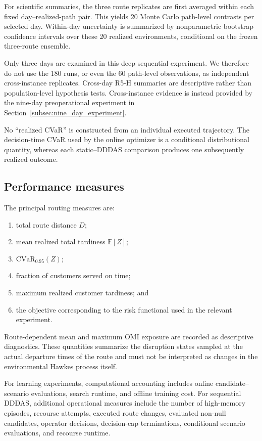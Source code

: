 \documentclass[preprint,12pt]{elsarticle}
\newcommand{\CVaR}{\mathrm{CVaR}}
\newcommand{\1}{\mathbf{1}}
\begin{document}
For scientific summaries, the three route replicates are first averaged within
each fixed day--realized-path pair. This yields 20 Monte Carlo path-level
contrasts per selected day. Within-day uncertainty is summarized by
nonparametric bootstrap confidence intervals over these 20 realized
environments, conditional on the frozen three-route ensemble.

Only three days are examined in this deep sequential experiment. We therefore
do not use the 180 runs, or even the 60 path-level observations, as independent
cross-instance replicates. Cross-day R5-H summaries are descriptive rather than
population-level hypothesis tests. Cross-instance evidence is instead provided
by the nine-day preoperational experiment in
Section~\ref{subsec:nine_day_experiment}.

No ``realized CVaR'' is constructed from an individual executed trajectory.
The decision-time CVaR used by the online optimizer is a conditional
distributional quantity, whereas each static--DDDAS comparison produces one
subsequently realized outcome.

\subsection{Performance measures}
\label{subsec:performance_metrics}

The principal routing measures are:
\begin{enumerate}
	\item total route distance $D$;
	\item mean realized total tardiness $\mathbb{E}[Z]$;
	\item $\CVaR_{0.95}(Z)$;
	\item fraction of customers served on time;
	\item maximum realized customer tardiness; and
	\item the objective corresponding to the risk functional used in the
	relevant experiment.
\end{enumerate}

Route-dependent mean and maximum OMI exposure are recorded as descriptive
diagnostics. These quantities summarize the disruption states sampled at the
actual departure times of the route and must not be interpreted as changes in
the environmental Hawkes process itself.

For learning experiments, computational accounting includes online
candidate--scenario evaluations, search runtime, and offline training cost.
For sequential DDDAS, additional operational measures include the number of
high-memory episodes, recourse attempts, executed route changes, evaluated
non-null candidates, operator decisions, decision-cap terminations, conditional
scenario evaluations, and recourse runtime.
\end{document}
